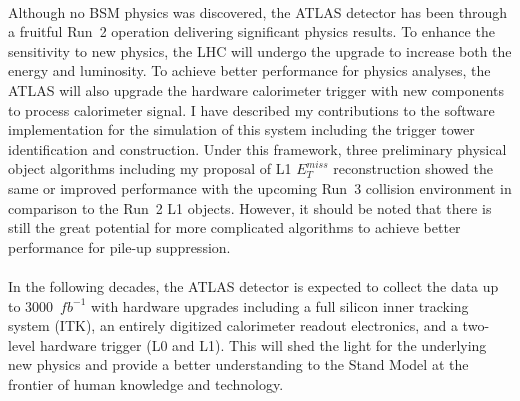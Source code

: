 \\Although no BSM physics was discovered, the ATLAS detector has been through a fruitful Run~2 operation delivering significant physics results. To enhance the sensitivity to new physics, the LHC will undergo the upgrade to increase both the energy and luminosity. To achieve better performance for physics analyses, the ATLAS will also upgrade the hardware calorimeter trigger with new components to process calorimeter signal. I have described my contributions to the software implementation for the simulation of this system including the trigger tower identification and construction. Under this framework, three preliminary physical object algorithms including my proposal of L1 $E^{miss}_{T}$ reconstruction showed the same or improved performance with the upcoming Run~3 collision environment in comparison to the Run~2 L1 objects. However, it should be noted that there is still the great potential for more complicated algorithms to achieve better performance for pile-up suppression. 
\\
\\In the following decades, the ATLAS detector is expected to collect the data up to 3000~$fb^{-1}$ with hardware upgrades including a full silicon inner tracking system (ITK), an entirely digitized calorimeter readout electronics, and a two-level hardware trigger (L0 and L1). This will shed the light for the underlying new physics and provide a better understanding to the Stand Model at the frontier of human knowledge and technology. 
\newpage
{}
